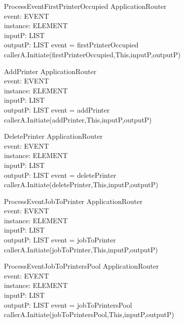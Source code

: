 \begin{schema}{ProcessEventFirstPrinterOccupied}
\Delta ApplicationRouter \\
event: EVENT \\
instance: ELEMENT \\
inputP: LIST \\
outputP: LIST
\where event = firstPrinterOccupied \\
callerA.Initiate(firstPrinterOccupied,This,inputP,outputP)
\end{schema}


\begin{schema}{AddPrinter}
\Delta ApplicationRouter \\
event: EVENT \\
instance: ELEMENT \\
inputP: LIST \\
outputP: LIST
\where event = addPrinter \\
callerA.Initiate(addPrinter,This,inputP,outputP)
\end{schema}

\begin{schema}{DeletePrinter}
\Delta ApplicationRouter \\
event: EVENT \\
instance: ELEMENT \\
inputP: LIST \\
outputP: LIST
\where event = deletePrinter \\
callerA.Initiate(deletePrinter,This,inputP,outputP)
\end{schema}

\begin{schema}{ProcessEventJobToPrinter}
\Delta ApplicationRouter \\
event: EVENT \\
instance: ELEMENT \\
inputP: LIST \\
outputP: LIST
\where event = jobToPrinter \\
callerA.Initiate(jobToPrinter,This,inputP,outputP)
\end{schema}

\begin{schema}{ProcessEventJobToPrintersPool}
\Delta ApplicationRouter \\
event: EVENT \\
instance: ELEMENT \\
inputP: LIST \\
outputP: LIST
\where event = jobToPrintersPool \\
callerA.Initiate(jobToPrintersPool,This,inputP,outputP)
\end{schema}

